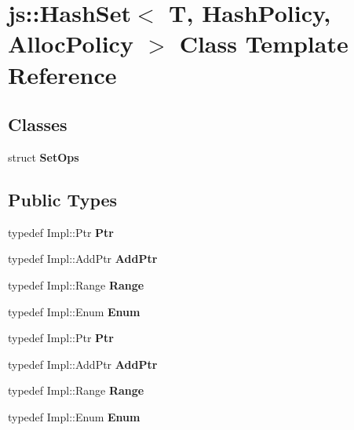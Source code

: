 \hypertarget{classjs_1_1_hash_set}{\section{js\-:\-:Hash\-Set$<$ T, Hash\-Policy, Alloc\-Policy $>$ Class Template Reference}
\label{classjs_1_1_hash_set}
}
\subsection*{Classes}
\begin{DoxyCompactItemize}
\item 
struct {\bfseries Set\-Ops}
\end{DoxyCompactItemize}
\subsection*{Public Types}
\begin{DoxyCompactItemize}
\item 
\hypertarget{classjs_1_1_hash_set_ad8af6afdd83de534dc6f065ef1701e79}{typedef Impl\-::\-Ptr {\bfseries Ptr}}\label{classjs_1_1_hash_set_ad8af6afdd83de534dc6f065ef1701e79}

\item 
\hypertarget{classjs_1_1_hash_set_a50ae9f6f13efb08cfe14a0504f0e5854}{typedef Impl\-::\-Add\-Ptr {\bfseries Add\-Ptr}}\label{classjs_1_1_hash_set_a50ae9f6f13efb08cfe14a0504f0e5854}

\item 
\hypertarget{classjs_1_1_hash_set_abc96e4d661e39f63b92fd2a3f80bdf8b}{typedef Impl\-::\-Range {\bfseries Range}}\label{classjs_1_1_hash_set_abc96e4d661e39f63b92fd2a3f80bdf8b}

\item 
\hypertarget{classjs_1_1_hash_set_a14cdbf409caa0e654e9b59d14ba7c0d4}{typedef Impl\-::\-Enum {\bfseries Enum}}\label{classjs_1_1_hash_set_a14cdbf409caa0e654e9b59d14ba7c0d4}

\item 
\hypertarget{classjs_1_1_hash_set_ad8af6afdd83de534dc6f065ef1701e79}{typedef Impl\-::\-Ptr {\bfseries Ptr}}\label{classjs_1_1_hash_set_ad8af6afdd83de534dc6f065ef1701e79}

\item 
\hypertarget{classjs_1_1_hash_set_a50ae9f6f13efb08cfe14a0504f0e5854}{typedef Impl\-::\-Add\-Ptr {\bfseries Add\-Ptr}}\label{classjs_1_1_hash_set_a50ae9f6f13efb08cfe14a0504f0e5854}

\item 
\hypertarget{classjs_1_1_hash_set_abc96e4d661e39f63b92fd2a3f80bdf8b}{typedef Impl\-::\-Range {\bfseries Range}}\label{classjs_1_1_hash_set_abc96e4d661e39f63b92fd2a3f80bdf8b}

\item 
\hypertarget{classjs_1_1_hash_set_a14cdbf409caa0e654e9b59d14ba7c0d4}{typedef Impl\-::\-Enum {\bfseries Enum}}\label{classjs_1_1_hash_set_a14cdbf409caa0e654e9b59d14ba7c0d4}

\end{DoxyCompactItemize}
